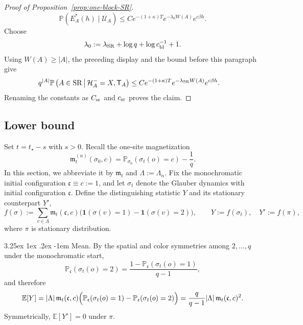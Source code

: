 \documentclass[letterpaper,11pt,reqno]{amsart}
\makeatletter
\theoremstyle{definition}
\renewcommand\paragraph{\@startsection{paragraph}{4}{\z@}%
  {3.25ex \@plus1ex \@minus.2ex}%
  {-1em}%
  {\normalfont\normalsize\bfseries}}
\makeatother
\begin{document}
\begin{proof}[Proof of Proposition~\ref{prop:one-block-SR}]
\[
        \mathbb P(E_A^*(h)\mid\mathcal U_A)
        \le
        C e^{-(1+\kappa)T}e^{-\lambda_0W(A)}e^{c\beta h}.
\]
Choose
\[
        \lambda_0:=\lambda_{\rm SR}+\log q+\log c_{\rm bl}^{-1}+1.
\]
Using \(W(A)\ge |A|\), the preceding display and the bound before this
paragraph give
\[
\begin{aligned}
    q^{|A|}
    \mathbb P
    \left(
        A\in{\rm SR}
        \,\middle|\,
        \mathcal H_A^-=X,\mathsf T_A
    \right)
    &\le
    C
    e^{-(1+\kappa)T}
    e^{-\lambda_{\rm SR} W(A)}
    e^{c\beta h}.
\end{aligned}
\]
Renaming the constants as \(C_{\rm sr}\) and \(c_{\rm sr}\) proves the claim.





\end{proof}




\subsection{Lower bound}
Set $t=t_\star-s$ with $s>0$. Recall the one-site magnetization
\[
    \mathfrak{m}_t^{(n)}(\sigma_0,c)
    = \mathbb P_{\sigma_0}(\sigma_t(o)=c)-\frac1q.
\]
In this section, we abbreviate it by $\mathfrak{m}_t$ and $\Lambda:=\Lambda_n$. Fix the monochromatic initial configuration $\mathfrak{c}\equiv c:=1$, and let $\sigma_t$ denote the Glauber dynamics with initial configuration $\mathfrak{c}$. Define the distinguishing statistic $Y$ and its stationary counterpart $Y'$,
\[
    f(\sigma) := \sum_{v\in\Lambda} \mathfrak{m}_t(\mathfrak{c},c)\bigl(\mathbf 1(\sigma(v)=1)-\mathbf 1(\sigma(v)=2)\bigr), \qquad Y := f(\sigma_t), \quad Y' := f(\pi),
\]
where $\pi$ is stationary distribution.

\paragraph{Mean.}
By the spatial and color symmetries among $2,\dots,q$ under the monochromatic start,
\[
    \mathbb P_{\mathfrak{c}}(\sigma_t(o)=2) = \frac{1-\mathbb P_{\mathfrak{c}}(\sigma_t(o)=1)}{q-1},
\]
and therefore
\[
    \mathbb E[Y] = |\Lambda|\,\mathfrak{m}_t(\mathfrak{c},c)\Bigl(\mathbb P_{\mathfrak{c}}(\sigma_t(o)=1)-\mathbb P_{\mathfrak{c}}(\sigma_t(o)=2)\Bigr) = \frac{q}{q-1}|\Lambda|\,\mathfrak{m}_t(\mathfrak{c},c)^2.
\]
Symmetrically, $\mathbb E[Y']=0$ under $\pi$.
\end{document}
